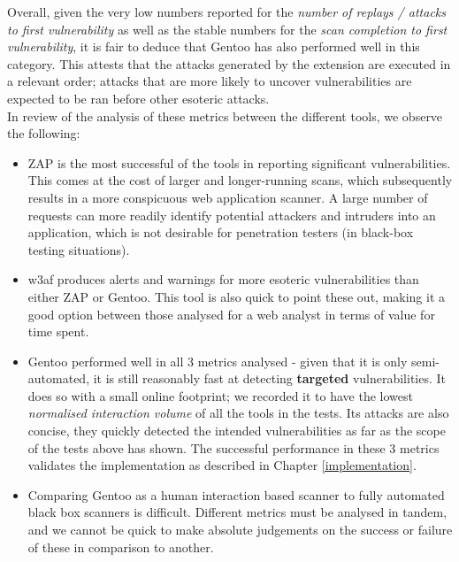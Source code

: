  Overall, given the very low numbers reported for the \textit{number of replays / attacks to first vulnerability} as well as the stable numbers for the \textit{scan completion to first vulnerability}, it is fair to deduce that Gentoo has also performed well in this category. This attests that the attacks generated by the extension are executed in a relevant order; attacks that are more likely to uncover vulnerabilities are expected to be ran before other esoteric attacks. \\
 
 In review of the analysis of these metrics between the different tools, we observe the following: 
 
 \begin{itemize}
 	\item ZAP is the most successful of the tools in reporting significant vulnerabilities. This comes at the cost of larger and longer-running scans, which subsequently results in a more conspicuous web application scanner. A large number of requests can more readily identify potential attackers and intruders into an application, which is not desirable for penetration testers (in black-box testing situations).
 	
 	\item w3af produces alerts and warnings for more esoteric vulnerabilities than either ZAP or Gentoo. This tool is also quick to point these out, making it a good option between those analysed for a web analyst in terms of value for time spent.
 	
 	\item Gentoo performed well in all 3 metrics analysed - given that it is only semi-automated, it is still reasonably fast at detecting \textbf{targeted} vulnerabilities. It does so with a small online footprint; we recorded it to have the lowest \textit{normalised interaction volume} of all the tools in the tests. Its attacks are also concise, they quickly detected the intended vulnerabilities as far as the scope of the tests above has shown. The successful performance in these 3 metrics validates the implementation as described in Chapter \ref{implementation}.
 	
 	\item Comparing Gentoo as a human interaction based scanner to fully automated black box scanners is difficult. Different metrics must be analysed in tandem, and we cannot be quick to make absolute judgements on the success or failure of these in comparison to another. 
 \end{itemize}

